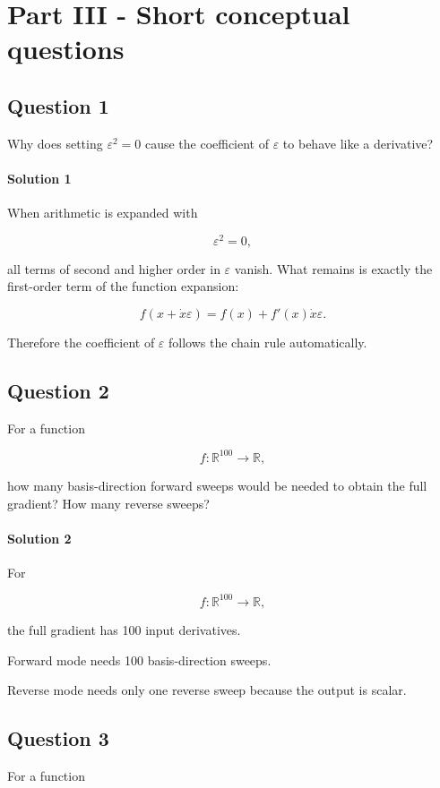 \documentclass[10pt]{article}
\begin{document}
\clearpage
\section*{Part III - Short conceptual questions}
\subsection*{Question 1}
Why does setting $\varepsilon^2=0$ cause the coefficient of $\varepsilon$ to behave like a derivative?

\begingroup\color{red}
\paragraph*{Solution 1}
When arithmetic is expanded with

\[
\varepsilon^2=0,
\]

all terms of second and higher order in $\varepsilon$ vanish. What remains is exactly the first-order term of the function expansion:

\[
f(x+\dot x\varepsilon)
=f(x)+f'(x)\dot x\varepsilon.
\]

Therefore the coefficient of $\varepsilon$ follows the chain rule automatically.
\par\endgroup

\subsection*{Question 2}
For a function

\[
f:\mathbb R^{100}\to\mathbb R,
\]

how many basis-direction forward sweeps would be needed to obtain the full gradient? How many reverse sweeps?

\begingroup\color{red}
\paragraph*{Solution 2}
For

\[
f:\mathbb R^{100}\to\mathbb R,
\]

the full gradient has 100 input derivatives.

Forward mode needs 100 basis-direction sweeps.

Reverse mode needs only one reverse sweep because the output is scalar.
\par\endgroup

\subsection*{Question 3}
For a function
\end{document}
